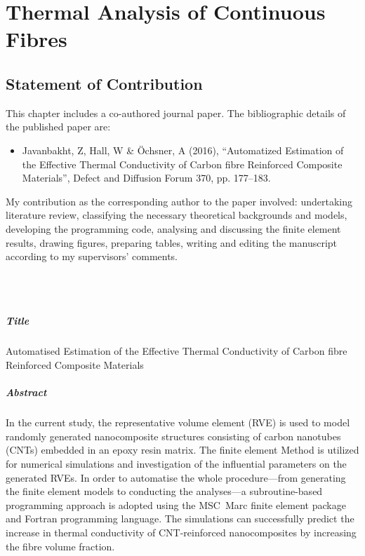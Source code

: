 
\chapter{Thermal Analysis of Continuous Fibres}\label{chap:p1}

\section*{Statement of Contribution}
	This chapter includes a co-authored journal paper. The bibliographic details of the published paper are:
\begin{itemize}
	\item Javanbakht, Z, Hall, W \& Öchsner, A (2016), “Automatized Estimation of the Effective Thermal Conductivity of Carbon fibre Reinforced Composite Materials”, Defect and Diffusion Forum 370, pp. 177–183.
\end{itemize}
	My contribution as the corresponding author to the paper involved: undertaking literature review, classifying the necessary theoretical backgrounds and models, developing the programming code, analysing and discussing the finite element results, drawing figures, preparing tables, writing and editing the manuscript according to my supervisors’ comments.

\Zia\\
\Wayne\\
\vfill
\newpage
\paragraph{Title} Automatised Estimation of the Effective Thermal Conductivity of Carbon fibre Reinforced Composite Materials

\paragraph{Abstract} In the current study, the representative volume element (RVE) is used to model randomly generated nanocomposite structures consisting of carbon nanotubes (CNTs) embedded in an epoxy resin matrix. The finite element Method is utilized for numerical simulations and investigation of the influential parameters on the generated RVEs. In order to automatise the whole procedure---from generating the finite element models to conducting the analyses---a subroutine-based programming approach is adopted using the MSC~Marc finite element package and Fortran programming language. The simulations can successfully predict the increase in thermal conductivity of CNT-reinforced nanocomposites by increasing the fibre volume fraction.

